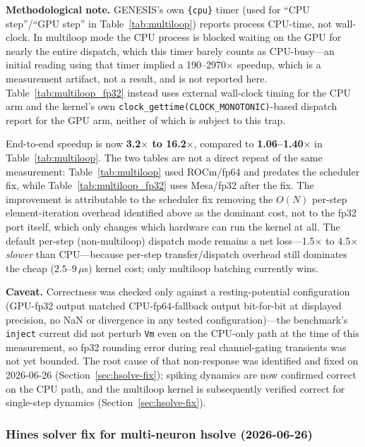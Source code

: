 \documentclass[11pt,a4paper]{article}
\begin{document}
\textbf{Methodological note.} GENESIS's own \texttt{\{cpu\}} timer (used for ``CPU
step''/``GPU step'' in Table~\ref{tab:multiloop}) reports process CPU-time, not
wall-clock. In multiloop mode the CPU process is blocked waiting on the GPU for nearly
the entire dispatch, which this timer barely counts as CPU-busy---an initial reading
using that timer implied a 190--2970$\times$ speedup, which is a measurement artifact,
not a result, and is not reported here. Table~\ref{tab:multiloop_fp32} instead uses
external wall-clock timing for the CPU arm and the kernel's own
\texttt{clock\_gettime(CLOCK\_MONOTONIC)}-based dispatch report for the GPU arm, neither
of which is subject to this trap.

End-to-end speedup is now \textbf{3.2$\times$ to 16.2$\times$}, compared to
\textbf{1.06--1.40$\times$} in Table~\ref{tab:multiloop}. The two tables are not a direct
repeat of the same measurement: Table~\ref{tab:multiloop} used ROCm/fp64 and predates the
scheduler fix, while Table~\ref{tab:multiloop_fp32} uses Mesa/fp32 after the fix. The
improvement is attributable to the scheduler fix removing the $O(N)$ per-step
element-iteration overhead identified above as the dominant cost, not to the fp32 port
itself, which only changes which hardware can run the kernel at all. The default
per-step (non-multiloop) dispatch mode remains a net loss---1.5$\times$ to 4.5$\times$
\emph{slower} than CPU---because per-step transfer/dispatch overhead still dominates the
cheap ($2.5$--$9\,\mu$s) kernel cost; only multiloop batching currently wins.

\textbf{Caveat.} Correctness was checked only against a resting-potential configuration
(GPU-fp32 output matched CPU-fp64-fallback output bit-for-bit at displayed precision, no
NaN or divergence in any tested configuration)---the benchmark's \texttt{inject} current
did not perturb \texttt{Vm} even on the CPU-only path at the time of this measurement,
so fp32 rounding error during real channel-gating transients was not yet bounded. The
root cause of that non-response was identified and fixed on 2026-06-26
(Section~\ref{sec:hsolve-fix}); spiking dynamics are now confirmed correct on the CPU
path, and the multiloop kernel is subsequently verified correct for single-step dynamics
(Section~\ref{sec:hsolve-fix}).

\subsubsection*{Hines solver fix for multi-neuron hsolve (2026-06-26)}
\label{sec:hsolve-fix}
\end{document}

